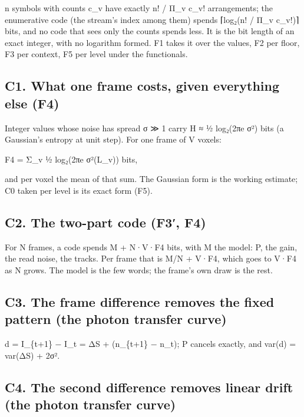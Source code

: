 n symbols with counts c\_\allowbreak{}v have exactly n! / Π\_\allowbreak{}v c\_\allowbreak{}v! arrangements; the enumerative code (the stream's index among them) spends ⌈log₂(n! / Π\_\allowbreak{}v c\_\allowbreak{}v!)⌉ bits, and no code that sees only the counts spends less. It is the bit length of an exact integer, with no logarithm formed. F1 takes it over the values, F2 per floor, F3 per context, F5 per level under the functionals.

\subsection{\texorpdfstring{C1. What one frame costs, given everything else (F4)}{C1. What one frame costs, given everything else (F4)}}

Integer values whose noise has spread σ ≫ 1 carry H ≈ ½ log₂(2πe σ²) bits (a Gaussian's entropy at unit step). For one frame of V voxels:

F4 = Σ\_\allowbreak{}v ½ log₂(2πe σ²(L\_\allowbreak{}v)) bits,

and per voxel the mean of that sum. The Gaussian form is the working estimate; C0 taken per level is its exact form (F5).

\subsection{\texorpdfstring{C2. The two-part code (F3′, F4)}{C2. The two-part code (F3′, F4)}}

For N frames, a code spends M + N·V·F4 bits, with M the model: P, the gain, the read noise, the tracks. Per frame that is M/N + V·F4, which goes to V·F4 as N grows. The model is the few words; the frame's own draw is the rest.

\subsection{\texorpdfstring{C3. The frame difference removes the fixed pattern (the photon transfer curve)}{C3. The frame difference removes the fixed pattern (the photon transfer curve)}}

d = I\_\allowbreak{}\{t+1\} − I\_\allowbreak{}t = ΔS + (n\_\allowbreak{}\{t+1\} − n\_\allowbreak{}t); P cancels exactly, and var(d) = var(ΔS) + 2σ².

\subsection{\texorpdfstring{C4. The second difference removes linear drift (the photon transfer curve)}{C4. The second difference removes linear drift (the photon transfer curve)}}

